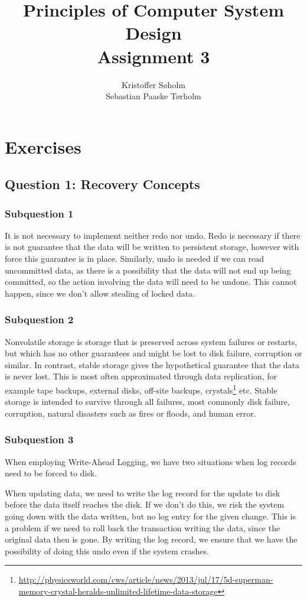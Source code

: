 \documentclass[11pt,a4paper]{article}
\title{Principles of Computer System Design\\Assignment 3}
\author{Kristoffer Søholm\\Sebastian Paaske Tørholm}
\begin{document}
\maketitle

\section{Exercises}
\subsection{Question 1: Recovery Concepts}
\subsubsection{Subquestion 1}
It is not necessary to implement neither redo nor undo. Redo is necessary if
there is not guarantee that the data will be written to persistent storage,
however with force this guarantee is in place. Similarly, undo is needed if we
can read uncommitted data, as there is a possibility that the data will not end
up being committed, so the action involving the data will need to be undone.
This cannot happen, since we don't allow stealing of locked data.

\subsubsection{Subquestion 2}
Nonvolatile storage is storage that is preserved across system failures or
restarts, but which has no other guarantees and might be lost to disk failure,
corruption or similar. In contrast, stable storage gives the hypothetical
guarantee that the data is never lost. This is most often approximated through
data replication, for example tape backups, external disks, off-site backups,
crystals\footnote{\url{http://physicsworld.com/cws/article/news/2013/jul/17/5d-superman-memory-crystal-heralds-unlimited-lifetime-data-storage}} etc. 
Stable storage is intended to survive through all failures, most commonly disk
failure, corruption, natural disasters such as fires or floods, and human
error.

\subsubsection{Subquestion 3}
When employing Write-Ahead Logging, we have two situations when log records
need to be forced to disk.

When updating data, we need to write the log record for the update to disk
before the data itself reaches the disk. If we don't do this, we risk the
system going down with the data written, but no log entry for the given
change. This is a problem if we need to roll back the transaction writing
the data, since the original data then is gone. By writing the log record,
we ensure that we have the possibility of doing this undo even if the system
crashes.
\end{document}
